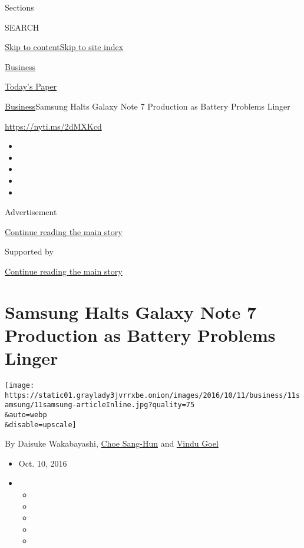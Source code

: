 Sections

SEARCH

\protect\hyperlink{site-content}{Skip to
content}\protect\hyperlink{site-index}{Skip to site index}

\href{https://www.nytimes3xbfgragh.onion/section/business}{Business}

\href{https://myaccount.nytimes3xbfgragh.onion/auth/login?response_type=cookie\&client_id=vi}{}

\href{https://www.nytimes3xbfgragh.onion/section/todayspaper}{Today's
Paper}

\href{/section/business}{Business}\textbar{}Samsung Halts Galaxy Note 7
Production as Battery Problems Linger

\url{https://nyti.ms/2dMXKcd}

\begin{itemize}
\item
\item
\item
\item
\item
\end{itemize}

Advertisement

\protect\hyperlink{after-top}{Continue reading the main story}

Supported by

\protect\hyperlink{after-sponsor}{Continue reading the main story}

\hypertarget{samsung-halts-galaxy-note-7-production-as-battery-problems-linger}{%
\section{Samsung Halts Galaxy Note 7 Production as Battery Problems
Linger}\label{samsung-halts-galaxy-note-7-production-as-battery-problems-linger}}

\texttt{[image: https://static01.graylady3jvrrxbe.onion/images/2016/10/11/business/11samsung/11samsung-articleInline.jpg?quality=75\\\&auto=webp\\\&disable=upscale]}

By Daisuke Wakabayashi,
\href{http://www.nytimes3xbfgragh.onion/by/choe-sang-hun}{Choe Sang-Hun}
and \href{http://www.nytimes3xbfgragh.onion/by/vindu-goel}{Vindu Goel}

\begin{itemize}
\item
  Oct. 10, 2016
\item
  \begin{itemize}
  \item
  \item
  \item
  \item
  \item
  \end{itemize}
\end{itemize}

